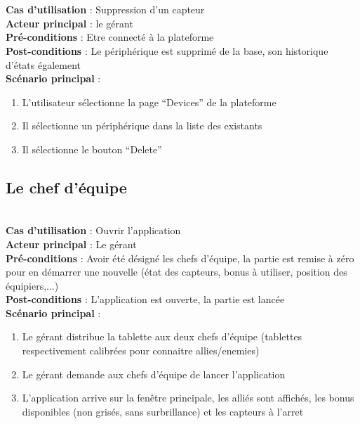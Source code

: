 \paragraph{}
~\\
\textbf{Cas d’utilisation} : Suppression d’un capteur\\
\textbf{Acteur principal} : le gérant\\
\textbf{Pré-conditions} : Etre connecté à la plateforme\\
\textbf{Post-conditions} : Le périphérique est supprimé de la base, son historique d’états également\\
\textbf{Scénario principal} :
\begin{enumerate}
 \item L’utilisateur sélectionne la page “Devices” de la plateforme
 \item Il sélectionne un périphérique dans la liste des existants
 \item Il sélectionne le bouton “Delete”
\end{enumerate}


\subsection{Le chef d'équipe}
~\\
\textbf{Cas d’utilisation} : Ouvrir l’application\\
\textbf{Acteur principal} : Le gérant\\
\textbf{Pré-conditions} : Avoir été désigné les chefs d’équipe, la partie est remise à zéro pour en démarrer une nouvelle (état des capteurs, bonus à utiliser, position des équipiers,...)\\
\textbf{Post-conditions} : L’application est ouverte, la partie est lancée\\
\textbf{Scénario principal} :
\begin{enumerate}
 \item Le gérant distribue la tablette aux deux chefs d’équipe (tablettes respectivement calibrées pour connaitre allies/enemies)
 \item Le gérant demande aux chefs d’équipe de lancer l’application
 \item L’application arrive sur la fenêtre principale, les alliés sont affichés, les bonus disponibles (non grisés, sans surbrillance) et les capteurs à l’arret
\end{enumerate}

